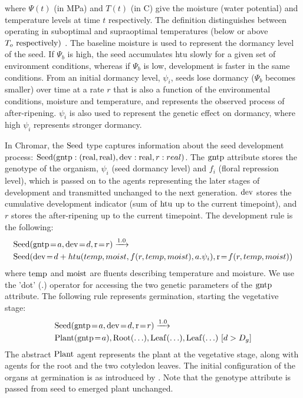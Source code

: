where \(\Psi(t)\) (in MPa) and \(T(t)\) (in \textdegree C) give the moisture
(water potential) and temperature levels at time \(t\) respectively. The
definition distinguishes between operating in suboptimal and supraoptimal
temperatures (below or above \(T_{o}\ \mathrm{respectively})\ \). The baseline
moisture is used to represent the dormancy level of the seed. If \(\Psi_{b}\) is
high, the seed accumulates htu slowly for a given set of environment conditions,
whereas if \(\Psi_{b}\) is low, development is faster in the same
conditions. From an initial dormancy level, \(\psi_{i}\), seeds lose dormancy
(\(\Psi_{b}\) becomes smaller) over time at a rate $r$ that is also a function
of the environmental conditions, moisture and temperature, and represents the
observed process of after-ripening.  \(\psi_{i}\) is also used to represent the
genetic effect on dormancy, where high \(\psi_{i}\) represents stronger
dormancy.

In Chromar, the \(\mathrm{Seed}\) type captures information about the seed
development process:
\(\mathrm{Seed}(\mathrm{gntp}:(\mathrm{real},\mathrm{real}),\mathrm{dev}:\mathrm{real},r:real)\).  The
\(\mathrm{gntp}\) attribute stores the genotype of the organism, \(\psi_{i}\) (seed
dormancy level) and \(f_{i}\) (floral repression level), which is passed on to
the agents representing the later stages of development and transmitted
unchanged to the next generation.  \(\mathrm{dev}\) stores the cumulative
development indicator (sum of \(\mathrm{htu}\) up to the current timepoint), and
\(r\) stores the after-ripening up to the current timepoint. The development
rule is the following:
\begin{equation*}
\begin{split}
& \mr{Seed}(\ar{gntp}{a}, \ar{dev}{d}, \ar{r}{r}) \xrightarrow{1.0} \\ 
&\mr{Seed}(\ar{dev}{d + htu(temp, moist, f(r,temp,moist), a.\psi_i)}, 
\ar{r}{f(r, temp, moist)})
\end{split}
\end{equation*}
where \(\mathrm{temp}\) and \(\mathrm{moist}\) are fluents describing
temperature and moisture. We use the 'dot' (\(.\)) operator for
accessing the two genetic parameters of the \(\mathrm{gntp}\) attribute.
The following rule represents germination, starting the vegetative
stage:
\begin{equation*}
\begin{split}
& \mr{Seed}(\ar{gntp}{a},\ar{dev}{d},\ar{r}{r} ) \xrightarrow{1.0} \\
& \mr{Plant}(\ar{gntp}{a}), \mr{Root}(\ldots),\mr{Leaf}( \ldots ), \mr{Leaf}(\ldots) \, \, \lbrack d > D_{g}\rbrack
\end{split}
\end{equation*}
The abstract \(\mathrm{Plant}\) agent represents the plant at the vegetative stage,
along with agents for the root and the two cotyledon leaves. The initial
configuration of the organs at germination is as introduced by
\citet{chew_multiscale_2014}. Note that the genotype attribute is passed from
seed to emerged plant unchanged.

